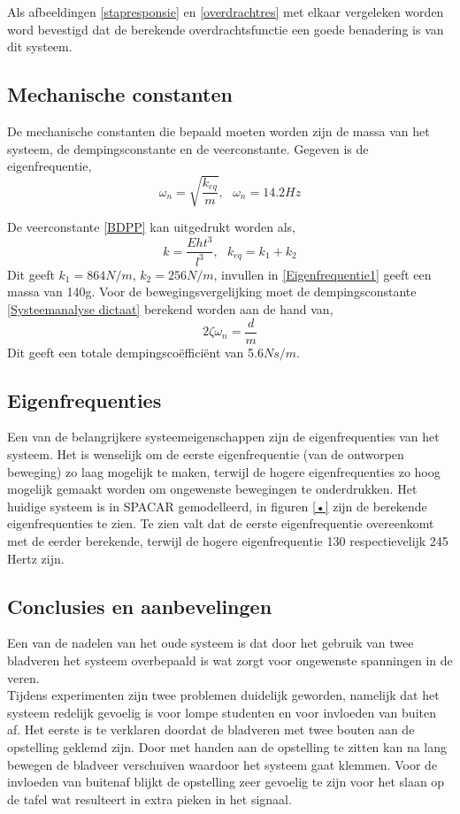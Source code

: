 \documentclass[a4paper]{article}
\begin{document}
Als afbeeldingen \ref{stapresponsie} en \ref{overdrachtres} met elkaar vergeleken worden word bevestigd dat de berekende overdrachtsfunctie een goede benadering is van dit systeem. 

\subsection{Mechanische constanten}

De mechanische constanten die bepaald moeten worden zijn de massa van het systeem, de dempingsconstante en de veerconstante. Gegeven is de eigenfrequentie,\\ 

\begin{equation}
\omega_n=\sqrt{\frac{k_{eq}}{m}}, \ \ \ \omega_n=14.2Hz
\label{Eigenfrequentie1}
\end{equation}

De veerconstante \ref{BDPP} kan uitgedrukt worden als,
\begin{equation}
k=\frac{Eht^3}{l^3}, \ \ \ k_{eq}=k_1+k_2
\label{Veerstijfheid} 
\end{equation} 
Dit geeft $k_1=864$$N/m$, $k_2=256$$N/m$, invullen in \ref{Eigenfrequentie1} geeft een massa van 140g. Voor de bewegingsvergelijking moet de dempingsconstante \ref{Systeemanalyse dictaat} berekend worden aan de hand van,
\begin{equation}
2\zeta\omega_n=\frac{d}{m}
\end{equation} 
Dit geeft een totale dempingscoëfficiënt van 5.6$Ns/m$.\\

\newpage
\subsection{Eigenfrequenties}
Een van de belangrijkere systeemeigenschappen zijn de eigenfrequenties van het systeem. Het is wenselijk om de eerste eigenfrequentie (van de ontworpen beweging) zo laag mogelijk te maken, terwijl de hogere eigenfrequenties zo hoog mogelijk gemaakt worden om ongewenste bewegingen te onderdrukken. Het huidige systeem is in SPACAR gemodelleerd, in figuren \ref{•} zijn de berekende eigenfrequenties te zien. Te zien valt dat de eerste eigenfrequentie overeenkomt met de eerder berekende, terwijl de hogere eigenfrequentie 130 respectievelijk 245 Hertz zijn.
\subsection{Conclusies en aanbevelingen}
Een van de nadelen van het oude systeem is dat door het gebruik van twee bladveren het systeem overbepaald is wat zorgt voor ongewenste spanningen in de veren. \\ Tijdens experimenten zijn twee problemen duidelijk geworden, namelijk dat het systeem redelijk gevoelig is voor lompe studenten en voor invloeden van buiten af. Het eerste is te verklaren doordat de bladveren met twee bouten aan de opstelling geklemd zijn. Door met handen aan de opstelling te zitten kan na lang bewegen de bladveer verschuiven waardoor het systeem gaat klemmen. Voor de invloeden van buitenaf blijkt de opstelling zeer gevoelig te zijn voor het slaan op de tafel wat resulteert in extra pieken in het signaal. 
\end{document}

